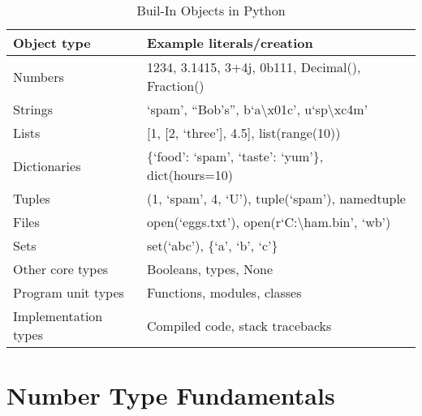 \documentclass[a4paper,11pt]{book}
\begin{document}
\begin{table}[!htbp]
\centering
\caption{Buil-In Objects in Python}
\label{tab:built_in_objects}
\begin{tabular}{@{}ll@{}}
\toprule \toprule
Object type          & Example literals/creation                                            \\ \midrule
Numbers              & 1234, 3.1415, 3+4j, 0b111, Decimal(), Fraction()                     \\
Strings              & `spam', ``Bob's'', b`a\textbackslash{}x01c', u`sp\textbackslash{}xc4m' \\
Lists                & {[}1, {[}2, `three'{]}, 4.5{]}, list(range(10))                      \\
Dictionaries         & \{`food': `spam', `taste': `yum'\}, dict(hours=10)                   \\
Tuples               & (1, `spam', 4, `U'), tuple(`spam'), namedtuple                       \\
Files                & open(`eggs.txt'), open(r`C:\textbackslash{}ham.bin', `wb')           \\
Sets                 & set(`abc'), \{`a', `b', `c'\}                                        \\
Other core types     & Booleans, types, None                                                \\
Program unit types   & Functions, modules, classes                                          \\
Implementation types & Compiled code, stack tracebacks                                      \\ \bottomrule
\end{tabular}
\end{table}

\section{Number Type Fundamentals}
\end{document}
